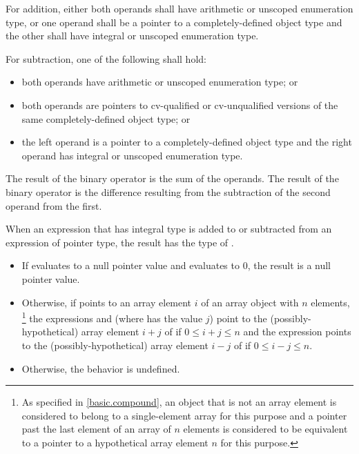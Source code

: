 %
For addition, either both operands shall have arithmetic or unscoped enumeration
type, or one operand shall be a pointer to a completely-defined object
type and the other shall have integral or unscoped enumeration type.

\pnum
For subtraction, one of the following shall hold:
\begin{itemize}
\item both operands have arithmetic or unscoped enumeration type; or

\item
{}%
both operands are pointers to cv-qualified or cv-unqualified
versions of the same completely-defined object type; or

\item the left operand is a pointer to a completely-defined object type
and the right operand has integral or unscoped enumeration type.
\end{itemize}

\pnum
The result of the binary \tcode{+} operator is the sum of the operands.
The result of the binary \tcode{-} operator is the difference resulting
from the subtraction of the second operand from the first.

\pnum
{}%
When an expression  that has integral type
is added to or subtracted from an expression  of pointer type,
the result has the type of .
\begin{itemize}
\item If  evaluates to a null pointer value and
 evaluates to 0, the result is a null pointer value.
\item Otherwise, if  points to an array element $i$
of an array object  with $n$ elements,%
\footnote{As specified in \ref{basic.compound},
an object that is not an array element
is considered to belong to a single-element array for this purpose and
a pointer past the last element of an array of $n$ elements
is considered to be equivalent to a pointer to a hypothetical array element
$n$ for this purpose.}
the expressions  and 
(where  has the value $j$)
point to the (possibly-hypothetical) array element
$i + j$ of  if $0 \le i + j \le n$
and the expression 
points to the (possibly-hypothetical) array element
$i - j$ of  if $0 \le i - j \le n$.
\item Otherwise, the behavior is undefined.
\end{itemize}

